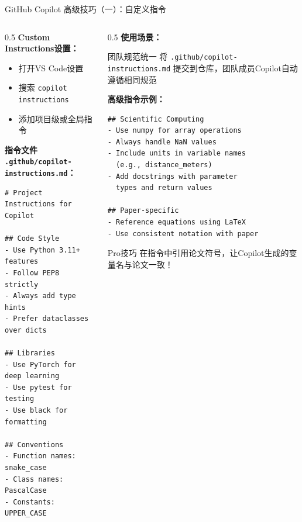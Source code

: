 \documentclass[aspectratio=169,11pt]{beamer}
\begin{document}
\begin{frame}[fragile]{GitHub Copilot 高级技巧（一）：自定义指令}
    \begin{columns}
        \begin{column}{0.5\textwidth}
            \textbf{Custom Instructions设置：}
            \begin{itemize}
                \item 打开VS Code设置
                \item 搜索 \texttt{copilot instructions}
                \item 添加项目级或全局指令
            \end{itemize}
            
            \vspace{0.3cm}
            \textbf{指令文件 \texttt{.github/copilot-instructions.md}：}
            \begin{lstlisting}[basicstyle=\ttfamily\tiny]
# Project Instructions for Copilot

## Code Style
- Use Python 3.11+ features
- Follow PEP8 strictly
- Always add type hints
- Prefer dataclasses over dicts

## Libraries
- Use PyTorch for deep learning
- Use pytest for testing
- Use black for formatting

## Conventions
- Function names: snake_case
- Class names: PascalCase
- Constants: UPPER_CASE
            \end{lstlisting}
        \end{column}
        \begin{column}{0.5\textwidth}
            \textbf{使用场景：}
            \begin{block}{团队规范统一}
                \small
                将 \texttt{.github/copilot-instructions.md} 提交到仓库，团队成员Copilot自动遵循相同规范
            \end{block}
            
            \vspace{0.2cm}
            \textbf{高级指令示例：}
            \begin{lstlisting}[basicstyle=\ttfamily\tiny]
## Scientific Computing
- Use numpy for array operations
- Always handle NaN values
- Include units in variable names
  (e.g., distance_meters)
- Add docstrings with parameter 
  types and return values

## Paper-specific
- Reference equations using LaTeX
- Use consistent notation with paper
            \end{lstlisting}
            
            \begin{alertblock}{Pro技巧}
                \small
                在指令中引用论文符号，让Copilot生成的变量名与论文一致！
            \end{alertblock}
        \end{column}
    \end{columns}
\end{frame}
\end{document}
